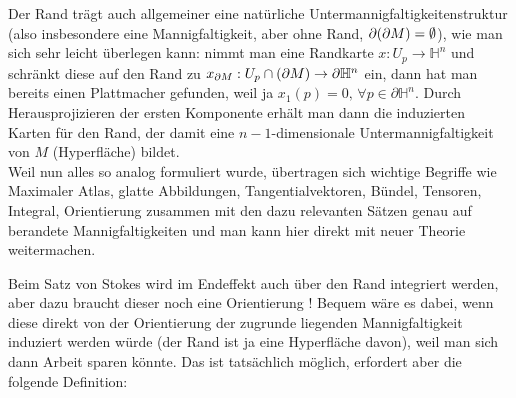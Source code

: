 \documentclass[../H_Analysis_main.tex]{subfiles}
\begin{document}

Der Rand trägt auch allgemeiner eine natürliche Untermannigfaltigkeitenstruktur (also insbesondere eine Mannigfaltigkeit, aber ohne Rand, $\partial \qty(\partial M) = \emptyset$), wie man sich sehr leicht überlegen kann: nimmt man eine Randkarte $x: U_p \rightarrow \mathbb{H}^n$ und schränkt diese auf den Rand zu $x_{\partial M}: U_p \cap \qty(\partial M) \rightarrow \partial\mathbb{H}^n$ ein, dann hat man bereits einen Plattmacher gefunden, weil ja $x_1(p) = 0, \, \forall p \in \partial\mathbb{H}^n$. Durch Herausprojizieren der ersten Komponente erhält man dann die induzierten Karten für den Rand, der damit eine $n - 1$-dimensionale Untermannigfaltigkeit von $M$ (Hyperfläche) bildet.\\


Weil nun alles so analog formuliert wurde, übertragen sich wichtige Begriffe wie Maximaler Atlas, glatte Abbildungen, Tangentialvektoren, Bündel, Tensoren, Integral, Orientierung zusammen mit den dazu relevanten Sätzen genau auf berandete Mannigfaltigkeiten und man kann hier direkt mit neuer Theorie weitermachen.

Beim Satz von Stokes wird im Endeffekt auch über den Rand integriert werden, aber dazu braucht dieser noch eine Orientierung ! Bequem wäre es dabei, wenn diese direkt von der Orientierung der zugrunde liegenden Mannigfaltigkeit induziert werden würde (der Rand ist ja eine Hyperfläche davon), weil man sich dann Arbeit sparen könnte. Das ist tatsächlich möglich, erfordert aber die folgende Definition:
\end{document}
